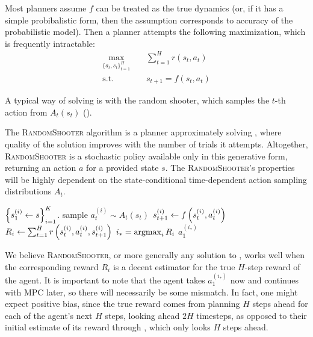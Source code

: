 \documentclass{article}
\begin{document}
Most planners assume $f$ can be treated as the true dynamics (or, if it has a simple probibalistic form, then the assumption corresponds to accuracy of the probabilistic model). Then a planner attempts the following maximization, which is frequently intractable:
\begin{align}
    \max_{\{a_t,s_t\}_{t=1}^H}&\;\;\;\; \sum_{t=1}^H r(s_t, a_t) \label{eq:unconstrained}\\
    \text{s.t.} &\;\;\;\; s_{t+1} = f(s_t,a_t)\nonumber
\end{align}

A typical way of solving  is with the random shooter, which samples the $t$-th action from $A_t(s_t)$ ().

\begin{algorithm}
\caption{The \textsc{RandomShooter} algorithm is a planner approximately solving , where quality of the solution improves with the number of trials it attempts. Altogether, \textsc{RandomShooter} is a stochastic policy available only in this generative form, returning an action $a$ for a provided state $s$. The \textsc{RandomShooter}'s properties will be highly dependent on the state-conditional time-dependent action sampling distributions $A_t$.}\label{alg:rs}
\begin{algorithmic}[1]
\State $\left\{{s_1^{(i)}\gets s}\right\}_{i=1}^K$.
\State sample $a_t^{(i)}\sim A_t(s_t)$
\State $s_{t+1}^{(i)}\gets f\left({s_t^{(i)},a_t^{(i)}}\right)$
\EndFor
\State $R_i\gets\sum_{t=1}^{H}r\left({s_{t}^{(i)},a_t^{(i)},s_{t+1}^{(i)}}\right)$
\EndFor
\State $i_*=\operatorname*{argmax}_i R_i$
\State \Return $a_1^{(i_*)}$
\EndProcedure
\end{algorithmic}
\end{algorithm}

We believe \textsc{RandomShooter}, or more generally any solution to , works well when the corresponding reward $R_i$ is a decent estimator for the true $H$-step reward of the agent. It is important to note that the agent takes $a_1^{(i_*)}$ now and continues with \textsc{MPC} later, so there will necessarily be some mismatch. In fact, one might expect positive bias, since the true reward comes from planning $H$ steps ahead for each of the agent's next $H$ steps, looking ahead $2H$ timesteps, as opposed to their initial estimate of its reward through , which only looks $H$ steps ahead.
\end{document}
